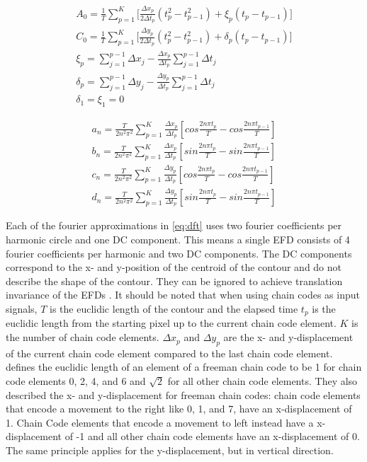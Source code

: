\documentclass[thesis.tex]{subfiles}
\begin{document}
\begin{equation} \label{eq:dft_dc}
\begin{split}
 A_0 =  \frac{1}{T} \sum_{p=1}^{K} \bigg[ \frac{\Delta x_p}{2 \Delta t_p} (t_p^2 - t_{p-1}^2) + \xi_p(t_p - t_{p-1})\bigg] \\
 C_0 =  \frac{1}{T} \sum_{p=1}^{K} \bigg[ \frac{\Delta y_p}{2 \Delta t_p} (t_p^2 - t_{p-1}^2) + \delta_p(t_p - t_{p-1})\bigg] \\
 \xi_p =  \sum_{j=1}^{p-1} \Delta x_j - \frac{\Delta x_p}{\Delta t_p} \sum_{j=1}^{p-1}\Delta t_j \\
 \delta_p =  \sum_{j=1}^{p-1} \Delta y_j - \frac{\Delta y_p}{\Delta t_p} \sum_{j=1}^{p-1}\Delta t_j \\
 \delta_1 =  \xi_1 = 0
\end{split}
\end{equation}    


\begin{equation} \label{eq:dft_coefficients}
\begin{split}
 a_n = \frac{T}{2n^2\pi^2} \sum_{p=1}^{K}\frac{\Delta x_p}{\Delta t_p}[cos\frac{2n\pi t_p}{T} - cos\frac{2n\pi t_{p-1}}{T}] \\
 b_n = \frac{T}{2n^2\pi^2} \sum_{p=1}^{K}\frac{\Delta x_p}{\Delta t_p}[sin\frac{2n\pi t_p}{T} - sin\frac{2n\pi t_{p-1}}{T}] \\
 c_n = \frac{T}{2n^2\pi^2} \sum_{p=1}^{K}\frac{\Delta y_p}{\Delta t_p}[cos\frac{2n\pi t_p}{T} - cos\frac{2n\pi t_{p-1}}{T}] \\
 d_n = \frac{T}{2n^2\pi^2} \sum_{p=1}^{K}\frac{\Delta y_p}{\Delta t_p}[sin\frac{2n\pi t_p}{T} - sin\frac{2n\pi t_{p-1}}{T}]
\end{split}
\end{equation} 

Each of the fourier approximations in \ref{eq:dft} uses two fourier coefficients per harmonic circle and one DC component. This means a single EFD consists of 4 fourier coefficients per harmonic and two DC components. The DC components correspond to the x- and y-position of the centroid of the contour and do not describe the shape of the contour. They can be ignored to achieve translation invariance of the EFDs \cite{giardinia}. It should be noted that when using chain codes as input signals, $T$ is the euclidic length of the contour and the elapsed time $t_p$ is the euclidic length from the starting pixel up to the current chain code element. $K$ is the number of chain code elements. $\Delta x_p$ and $\Delta y_p$ are the x- and y-displacement of the current chain code element compared to the last chain code element. \cite{giardinia} defines the euclidic length of an element of a freeman chain code to be 1 for chain code elements 0, 2, 4, and 6 and $\sqrt{2}$ for all other chain code elements. They also described the x- and y-displacement for freeman chain codes: chain code elements that encode a movement to the right like 0, 1, and 7, have an x-displacement of 1. Chain Code elements that encode a movement to left instead have a x-displacement of -1 and all other chain code elements have an x-displacement of 0. The same principle applies for the y-displacement, but in vertical direction. 
\end{document}
